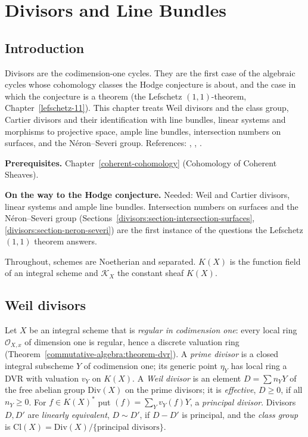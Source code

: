 \chapter{Divisors and Line Bundles}\label{divisors}

\section{Introduction}\label{divisors:section-introduction}

Divisors are the codimension-one cycles. They are the first case of the algebraic cycles whose cohomology classes the Hodge conjecture is
about, and the case in which the conjecture is a theorem (the Lefschetz $(1,1)$-theorem, Chapter~\ref{lefschetz-11}). This chapter treats
Weil divisors and the class group, Cartier divisors and their identification with line bundles, linear systems and morphisms to projective
space, ample line bundles, intersection numbers on surfaces, and the N\'eron--Severi group. References: \cite[Sections II.6, II.7 and V.1]{hartshorne-ag},
\cite[Chapter 1]{lazarsfeld-positivity-1}, \cite[Chapter I]{beauville-surfaces}.

\noindent\textbf{Prerequisites.} Chapter~\ref{coherent-cohomology} (Cohomology of Coherent Sheaves).

\noindent\textbf{On the way to the Hodge conjecture.} Needed: Weil and Cartier divisors, linear systems and ample line bundles. Intersection numbers on surfaces and the N\'eron--Severi group
(Sections~\ref{divisors:section-intersection-surfaces}, \ref{divisors:section-neron-severi}) are the first instance of the questions the Lefschetz $(1,1)$ theorem answers.

Throughout, schemes are Noetherian and separated. $K(X)$ is the function field of an integral scheme and $\mathcal{K}_X$ the constant sheaf $K(X)$.

\section{Weil divisors}\label{divisors:section-weil}

\begin{definition}\label{divisors:definition-weil}
Let $X$ be an integral scheme that is \emph{regular in codimension one}: every local ring $\mathcal{O}_{X,x}$ of dimension one is regular, hence a discrete valuation ring
(Theorem~\ref{commutative-algebra:theorem-dvr}). A \emph{prime divisor} is a closed integral subscheme $Y$ of codimension one; its generic point $\eta_Y$ has local
ring a DVR with valuation $v_Y$ on $K(X)$. A \emph{Weil divisor} is an element $D = \sum n_YY$ of the free abelian group $\mathrm{Div}(X)$ on the prime divisors; it is
\emph{effective}, $D \geq 0$, if all $n_Y \geq 0$. For $f \in K(X)^*$ put $(f) = \sum_Yv_Y(f)Y$, a \emph{principal divisor}. Divisors $D, D'$ are \emph{linearly
equivalent}, $D \sim D'$, if $D - D'$ is principal, and the \emph{class group} is $\mathrm{Cl}(X) = \mathrm{Div}(X)/\{\text{principal divisors}\}$.
\end{definition}

